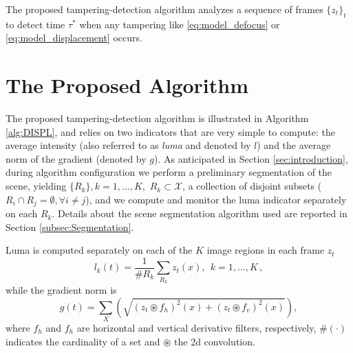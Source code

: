 \documentclass{llncs}
\begin{document}
The proposed tampering-detection algorithm analyzes a sequence of frames $\{z_t\}_t$ to detect time $\tau^*$ when any tampering like \eqref{eq:model_defocus} or \eqref{eq:model_displacement} occurs.



\section{The Proposed Algorithm}\label{sec:propSol}

The proposed tampering-detection algorithm is illustrated in Algorithm \ref{alg:DISPL}, and relies on two indicators that are very simple to compute: the average intensity (also referred to as \emph{luma} and denoted by $l$) and the average norm of the gradient (denoted by $g$). As anticipated in Section \ref{sec:introduction}, during algorithm configuration we perform a preliminary segmentation of the scene, yielding $\{R_k\}, k = 1,\dots,K,$  $R_k \subset \mathcal{X}$, a collection of disjoint subsets ($R_i  \cap R_j = \emptyset, \forall i \neq j$), and we compute and monitor the luma indicator separately on each $R_k$. Details about the scene segmentation algorithm used are reported in Section \ref{subsec:Segmentation}. 

Luma is computed separately on each of the $K$ image regions in each frame $z_t$
\begin{equation}\label{eq:lumaRegions}
l_k(t) =\frac{1}{\#R_k} \sum_{R_k} z_t(x), \ \ k = 1, \dots, K\,,
\end{equation}
while the gradient norm is
\begin{equation}
\label{eq:normaGradiente}
g(t) = \sum_X \left (\sqrt{\left(z_t \circledast f_h\right)^2(x) + \left(z_t \circledast f_v\right)^2(x)}\right),
\end{equation}
where $f_h$ and $f_h$ are horizontal and vertical derivative filters, respectively, $\#(\cdot)$ indicates the cardinality of a set and $\circledast$ the 2d convolution.
\end{document}
